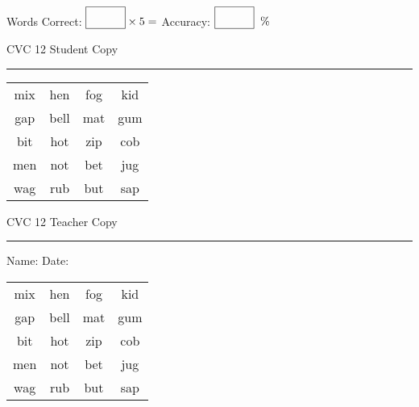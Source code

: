 \documentclass{memoir}
\begin{document}
\small

Words Correct: $\fbox{\phantom{\huge 100}} \times 5 = $ Accuracy: $\fbox{\phantom{\huge 100}}\;\; \%$ 

\vfill

\newpage


\footnotesize \noindent
CVC 12 \hfill Student Copy
\smallskip
\hrule

\Large

\setlength{\tabcolsep}{14pt}
\def\arraystretch{2}

{\selectfont


\begin{vplace}[0.5]
\begin{center}
\begin{tabular}{cccc}
mix & hen & fog & kid \\
gap & bell & mat & gum  \\
bit & hot & zip & cob \\
men & not & bet & jug \\
wag & rub & but & sap \\
\end{tabular}
\end{center}
\end{vplace}

}

\newpage

\footnotesize \noindent
CVC 12 \hfill Teacher Copy
\smallskip
\hrule

\small

\vfill

\noindent
Name: \underline{\hspace{1.75in}} \hfill Date: \underline{\hspace{1in}}

\Large

{\selectfont


\begin{vplace}[0.5]
\begin{center}
\begin{tabular}{cccc}
mix & hen & fog & kid \\
gap & bell & mat & gum  \\
bit & hot & zip & cob \\
men & not & bet & jug \\
wag & rub & but & sap \\
\end{tabular}
\end{center}
\end{vplace}



}
\end{document}
